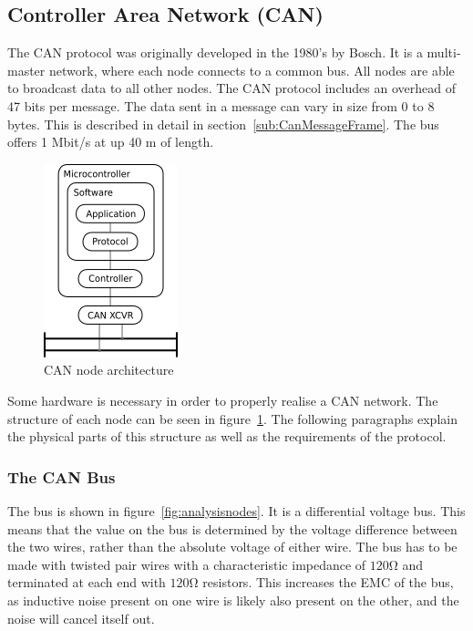 
\subsection{Controller Area Network (CAN)}\label{sec:canbusanalysis}
The CAN protocol was originally developed in the 1980's by Bosch.
It is a multi-master network, where each node connects to a common bus.
All nodes are able to broadcast data to all other nodes.
The CAN protocol includes an overhead of 47 bits per message.
The data sent in a message can vary in size from 0 to 8 bytes.
This is described in detail in section~\ref{sub:CanMessageFrame}.
The bus offers 1 Mbit/s at up 40 \si{\metre} of length.

\begin{figure}[h!]
	\centering
	\includegraphics{graphics/canbus_setup}
	\caption{CAN node architecture}
	\label{fig:canbus_setup}
\end{figure}

Some hardware is necessary in order to properly realise a CAN network.
The structure of each node can be seen in figure~\ref{fig:canbus_setup}.
The following paragraphs explain the physical parts of this structure as well as the requirements of the protocol.

\subsubsection*{The CAN Bus}
The bus is shown in figure~\ref{fig:analysisnodes}.
It is a differential voltage bus.
This means that the value on the bus is determined by the voltage difference between the two wires, rather than the absolute voltage of either wire.
The bus has to be made with twisted pair wires with a characteristic impedance of $\si{120 \ohm}$ and terminated at each end with $\si{120 \ohm}$ resistors.
This increases the EMC of the bus, as inductive noise present on one wire is likely also present on the other, and the noise will cancel itself out.\\

